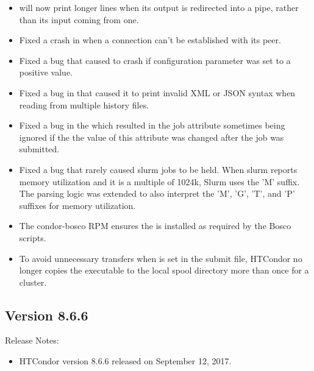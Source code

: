 \begin{itemize}
\item {} will now print longer lines when its output is
redirected into a pipe, rather than its input coming from one.

\item Fixed a crash in  when a connection can't be
established with its peer.

\item Fixed a bug that caused  to crash if
configuration parameter  was
set to a positive value.

\item Fixed a bug in  that caused it to print invalid
XML or JSON syntax when reading from multiple history files.

\item Fixed a bug in the  which resulted in the 
job attribute sometimes being ignored if the the value of this attribute was
changed after the job was submitted.

\item Fixed a bug that rarely caused slurm jobs to be held.
When slurm reports memory utilization and it is a multiple of 1024k,
Slurm uses the 'M' suffix.
The parsing logic was extended to also interpret the 'M', 'G', 'T', and 'P'
suffixes for memory utilization.

\item The condor-bosco RPM ensures the  is installed as required
by the Bosco scripts.

\item To avoid unnecessary transfers when  is set in
the submit file, HTCondor no longer copies the executable to the
local spool directory more than once for a cluster.

\end{itemize}

\subsection*{\label{sec:New-8-6-6}Version 8.6.6}

\noindent Release Notes:

\begin{itemize}

\item HTCondor version 8.6.6 released on September 12, 2017.

\end{itemize}


